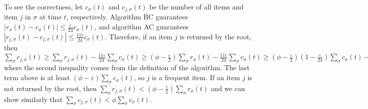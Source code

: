 \documentclass[proceedings]{stacs}
\theoremstyle{definition}\newtheorem{fact}{Fact}
\newcommand{\rs}{r_\sigma}
\newcommand{\rjs}{r_{j,\sigma}}
\newcommand{\nsm}{c_\sigma}
\newcommand{\cjsm}{c_{j,\sigma}}
\begin{document}
To see the correctness, let $\nsm(t)$ and $\cjsm(t)$
be the number of all items and item $j$ in $\sigma$ at time $t$, respectively.
Algorithm BC guarantees $| \rs(t) - \nsm(t) | \le \frac{\varepsilon}{24} \nsm(t)$,
and algorithm AC guarantees $| \rjs(t) - \cjsm(t) | \le \frac{11 \varepsilon}{24} \nsm(t)$.
Therefore, if an item $j$ is returned by the root, then
$ \sum_\sigma \cjsm(t)
\ge \textstyle \sum_\sigma \rjs(t) -
      \frac{11 \varepsilon}{24} \sum_\sigma \nsm(t)
\ge \textstyle (\phi - \frac{\varepsilon}{2}) \sum_\sigma \rs(t) -
      \frac{11 \varepsilon}{24}  \sum_\sigma \nsm(t)
\ge \textstyle (\phi - \frac{\varepsilon}{2}) (1 - \frac{\varepsilon}{24} ) \sum_\sigma \nsm(t)
      - \frac{11 \varepsilon}{24} \sum_\sigma \nsm(t)
\ge (\phi - \frac{\varepsilon}{2}  - \phi \frac{\varepsilon}{24}
- \frac{11 \varepsilon}{24}) \sum_\sigma \nsm(t)$
where the second inequality comes from the definition of the algorithm.
The last term above is at least $(\phi - \varepsilon) \sum_\sigma \nsm(t)$,
so $j$ is a frequent item.
If an item $j$ is not returned by the root, then $\sum_\sigma
\rjs(t) < (\phi - \frac{\varepsilon}{2}) \sum_\sigma \rs(t)$ and we can
show similarly that $\sum_\sigma \cjsm(t) < \phi \sum_\sigma \nsm(t)$.
\end{document}
